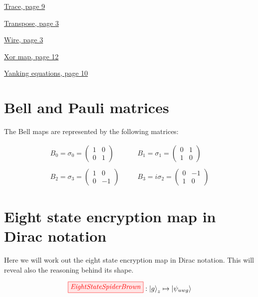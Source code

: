\documentclass[]{article}
\begin{document}
\hyperref[discarding]{Trace, page 9}

\hyperref[braandket]{Transpose, page 3}

\hyperref[identity]{Wire, page 3}

\hyperref[xorgate]{Xor map, page 12}

\hyperref[section:yankingequations]{Yanking equations, page 10}

\section{Bell and Pauli matrices}
\label{appendix:BellMaps}


The Bell maps are represented by the following matrices:

\begin{equation}
\begin{aligned}
B_0 = \sigma_0 = 
\begin{pmatrix}
1 & 0 \\
0 & 1
\end{pmatrix}  %
~~~~&~~~~ B_1 = \sigma_1 =
\begin{pmatrix}
0 & 1 \\
1 & 0
\end{pmatrix}%
\\\\
B_2 = \sigma_3 =
\begin{pmatrix}
1 & 0 \\
0 & -1
\end{pmatrix}  %
~~~~&~~~~  B_3 = i\sigma_2 =
\begin{pmatrix}
0 & -1 \\
1 & 0
\end{pmatrix}
\end{aligned}
\end{equation}

\section{Eight state encryption map in Dirac notation}
\label{appendix:EightStateEncryptionMapDirac}
Here we will work out the eight state encryption map in Dirac notation. This will reveal also the reasoning behind its shape. 

\begin{equation}
\tikzfig{EightStateSpiderBrown} :
\ket{g}_z \mapsto \ket{\psi_{uwg}}
\end{equation}
\end{document}
